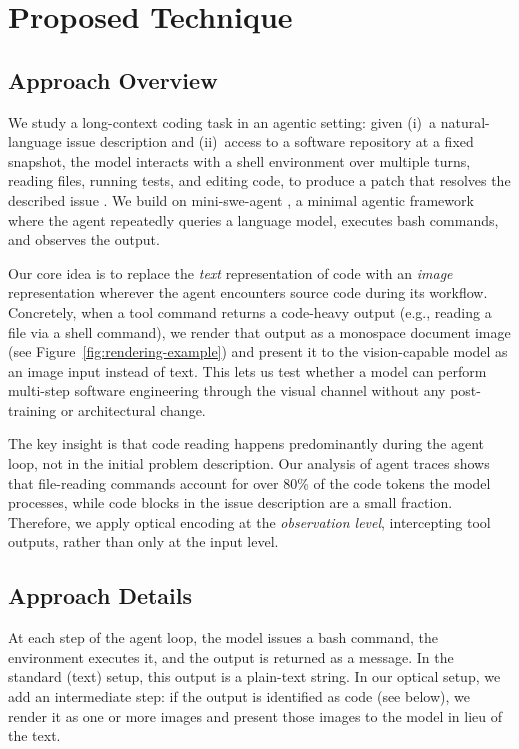 \section{Proposed Technique}

\subsection{Approach Overview}

We study a long-context coding task in an agentic setting: given (i)~a natural-language issue description and (ii)~access to a software repository at a fixed snapshot, the model interacts with a shell environment over multiple turns, reading files, running tests, and editing code, to produce a patch that resolves the described issue \cite{jimenez2023swebench}. We build on mini-swe-agent \cite{yang2024sweagent}, a minimal agentic framework where the agent repeatedly queries a language model, executes bash commands, and observes the output.

Our core idea is to replace the \emph{text} representation of code with an \emph{image} representation wherever the agent encounters source code during its workflow. Concretely, when a tool command returns a code-heavy output (e.g., reading a file via a shell command), we render that output as a monospace document image (see Figure~\ref{fig:rendering-example}) and present it to the vision-capable model as an image input instead of text. This lets us test whether a model can perform multi-step software engineering through the visual channel without any post-training or architectural change.

The key insight is that code reading happens predominantly during the agent loop, not in the initial problem description. Our analysis of agent traces shows that file-reading commands account for over 80\% of the code tokens the model processes, while code blocks in the issue description are a small fraction. Therefore, we apply optical encoding at the \emph{observation level}, intercepting tool outputs, rather than only at the input level.

\subsection{Approach Details}

At each step of the agent loop, the model issues a bash command, the environment executes it, and the output is returned as a message. In the standard (text) setup, this output is a plain-text string. In our optical setup, we add an intermediate step: if the output is identified as code (see below), we render it as one or more images and present those images to the model in lieu of the text.

